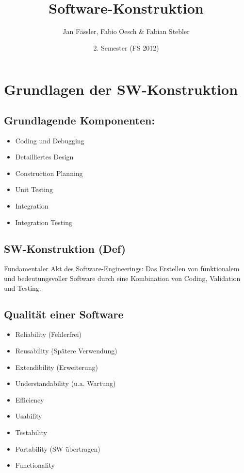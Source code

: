 \documentclass[a4paper,10pt]{article}
\title{Software-Konstruktion}
\author{Jan Fässler, Fabio Oesch \& Fabian Stebler}
\date{2. Semester (FS 2012)}
\begin{document}
\maketitle
\thispagestyle{fancy} %

\newpage
\section{Grundlagen der SW-Konstruktion}
\subsection{Grundlagende Komponenten:}
\begin{itemize}
 \item Coding und Debugging
 \item Detailliertes Design
 \item Construction Planning
 \item Unit Testing
 \item Integration
 \item Integration Testing
\end{itemize}
\subsection{SW-Konstruktion (Def)}
Fundamentaler Akt des Software-Engineerings: Das Erstellen von funktionalem und bedeutungsvoller Software durch eine Kombination von Coding, Validation und Testing.

\subsection{Qualität einer Software}
\begin{itemize}
 \item Reliability (Fehlerfrei)
 \item Reusability (Spätere Verwendung)
 \item Extendibility (Erweiterung)
 \item Understandability (u.a. Wartung)
 \item Efficiency 
 \item Usability
 \item Testability
 \item Portability (SW übertragen)
 \item Functionality
\end{itemize}
\end{document}
